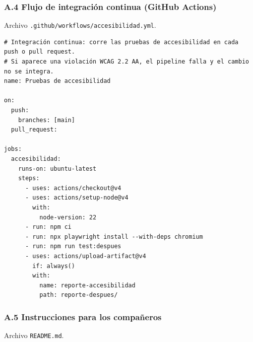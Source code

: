 \documentclass[10pt,letterpaper,onecolumn]{IEEEtran}
\begin{document}
\subsubsection{A.4 Flujo de integración continua (GitHub Actions)}\label{a.4-flujo-de-integraciuxf3n-continua-github-actions}

Archivo \texttt{.\allowbreak{}\allowbreak{}github/\allowbreak{}\allowbreak{}workflows/\allowbreak{}\allowbreak{}accesibilidad.\allowbreak{}\allowbreak{}yml}.

\begin{lstlisting}
# Integración continua: corre las pruebas de accesibilidad en cada push o pull request.
# Si aparece una violación WCAG 2.2 AA, el pipeline falla y el cambio no se integra.
name: Pruebas de accesibilidad

on:
  push:
    branches: [main]
  pull_request:

jobs:
  accesibilidad:
    runs-on: ubuntu-latest
    steps:
      - uses: actions/checkout@v4
      - uses: actions/setup-node@v4
        with:
          node-version: 22
      - run: npm ci
      - run: npx playwright install --with-deps chromium
      - run: npm run test:despues
      - uses: actions/upload-artifact@v4
        if: always()
        with:
          name: reporte-accesibilidad
          path: reporte-despues/
\end{lstlisting}

\subsubsection{A.5 Instrucciones para los compañeros}\label{a.5-instrucciones-para-los-compauxf1eros}

Archivo \texttt{README.\allowbreak{}\allowbreak{}md}.
\end{document}
